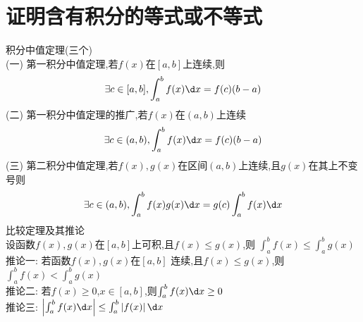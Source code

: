 \documentclass[12pt, a4paper, oneside, UTF8]{ctexbook}
\begin{document}
\section{证明含有积分的等式或不等式}
\begin{remark}
    积分中值定理(三个) \\
    (一) 第一积分中值定理,若$f(x)$在$[a,b]$上连续,则
    $$
    \exists c\in[a,b], \int_{a}^{b}f(x)\d x = f(c)(b-a)
    $$
    (二) 第一积分中值定理的推广,若$f(x)$在$(a,b)$上连续
    $$
    \exists c\in(a,b), \int_{a}^{b}f(x)\d x = f(c)(b-a)
    $$
    (三) 第二积分中值定理,若$f(x),g(x)$在区间$(a,b)$上连续,且$g(x)$在其上不变号则
    $$
    \exists c\in (a,b), \int_{a}^{b}f(x)g(x)\d x = g(c)\int_{a}^{b}f(x)\d x
    $$
    比较定理及其推论 \\
    设函数$f(x),g(x)$在$[a,b]$上可积,且$f(x)\leq g(x)$,则 $\int_{a}^{b}f(x)\leq \int_{a}^{b}g(x)$ \\
    推论一: 若函数$f(x),g(x)$在$[a,b]$ {\color{red} 连续},且$f(x)\leq g(x)$,则$\int_{a}^{b}f(x) < \int_{a}^{b}g(x)$ \\
    推论二: 若$f(x)\geq 0$,$x\in[a,b]$,则$\int_{a}^{b}f(x)\d x\geq 0$ \\
    推论三: $\left|\int_{a}^{b}f(x)\d x\right|\leq \int_{a}^{b}\left|f(x)\right|\d x$
\end{remark}

\newpage
\end{document}
